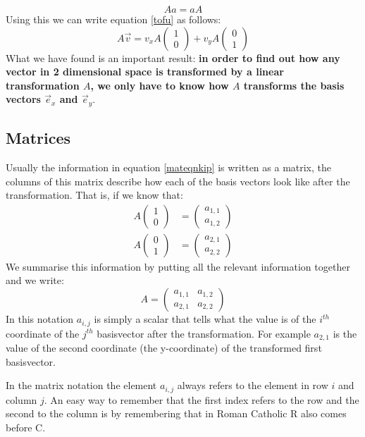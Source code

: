 \documentclass[a4paper]{report}
\begin{document}
\begin{equation}
A a = a A
\end{equation}
Using this we can write equation \ref{tofu} as follows:
\begin{equation}
A\vec{v}  =  v_x A \begin{pmatrix} 1 \\ 0 \end{pmatrix} + v_y A \begin{pmatrix} 0 \\ 1 \end{pmatrix}
\label{mateqnkip}
\end{equation}
What we have found is an important result: \textbf{in order to find out how any vector in 2 dimensional space is transformed by a linear transformation $A$, we only have to know how $A$ transforms the basis vectors $\vec{e}_x$ and $\vec{e}_y$}.

\subsection{Matrices}
Usually the information in equation \ref{mateqnkip} is written as a matrix, the columns of this matrix describe how each of the basis vectors look like after the transformation. That is, if we know that:
\begin{align}
A\begin{pmatrix} 1\\0\end{pmatrix} &= \begin{pmatrix} a_{1,1}\\a_{1,2}\end{pmatrix}\\[1.5em]
A\begin{pmatrix} 0\\1\end{pmatrix} &= \begin{pmatrix} a_{2,1}\\a_{2,2}\end{pmatrix}
\end{align}
We summarise this information by putting all the relevant information together and we write:
\begin{equation}
A = \begin{pmatrix} a_{1,1} & a_{1,2}\\ a_{2,1} & a_{2,2}\end{pmatrix}
\end{equation}
In this notation $a_{i,j}$ is simply a scalar that tells what the value is of the $i^{th}$ coordinate of the $j^{th}$ basisvector after the transformation. For example $a_{2,1}$ is the value of the second coordinate (the y-coordinate) of the transformed first basisvector.
\begin{mdframed}
In the matrix notation the element $a_{i,j}$ always refers to the element in row $i$ and column $j$. An easy way to remember that the first index refers to the row and the second to the column is by remembering that in Roman Catholic R also comes before C.
\end{mdframed}
\end{document}
